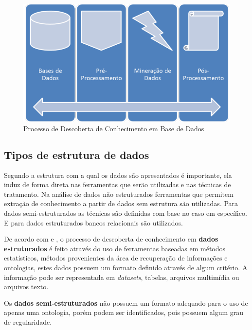 \documentclass[
	12pt,				%
	openright,			%
	twoside,			%
	a4paper,			%
	english,			%
	french,				%
	spanish,			%
	brazil				%
	]{abntex2}
\begin{document}
\begin{figure}[htb]
	\caption{\label{fig_processo_descoberta}Processo de Descoberta de Conhecimento em Base de Dados}
	\begin{center}
	    \includegraphics[scale=0.4]{imagens/Processo_de_descoberta_de_conhecimento_em_base_de_dados.pdf}
	\end{center}
\end{figure}

\subsection{Tipos de estrutura de dados}
Segundo  a estrutura com a qual os dados são apresentados é importante, ela induz de forma direta nas ferramentas que serão utilizadas e nas técnicas de tratamento. Na análise de dados  não estruturados ferramentas que permitem extração de conhecimento a partir de dados sem estrutura são utilizadas. Para dados semi-estruturados as técnicas são definidas  com base no caso em específico. E para dados estruturados bancos relacionais são utilizados.

De acordo com  e , o processo de descoberta de conhecimento em \textbf{dados estruturados} é feito através do uso de ferramentas baseadas em métodos estatísticos, métodos provenientes da área de recuperação de informações e  ontologias, estes dados possuem um formato definido através de algum critério. A informação pode ser representada em \emph{datasets}, tabelas, arquivos multimídia ou arquivos texto. 

Os \textbf{dados semi-estruturados} não possuem um formato adequado para o uso de apenas uma ontologia, porém podem ser identificados, pois possuem algum grau de regularidade.
\end{document}
